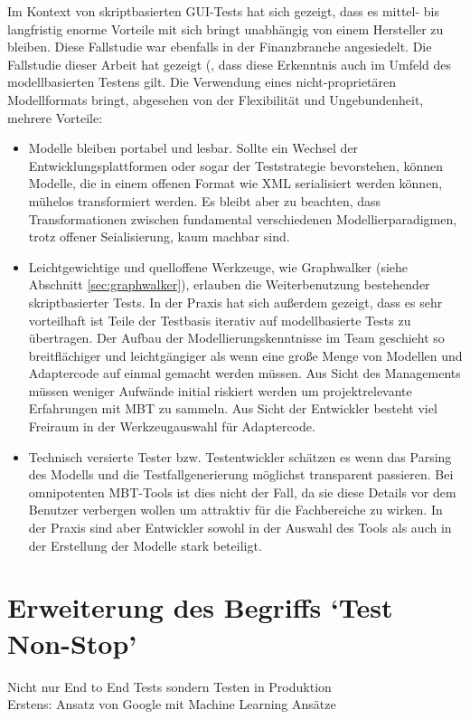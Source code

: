 Im Kontext von skriptbasierten GUI-Tests hat sich gezeigt, dass es mittel- bis langfristig enorme Vorteile mit sich bringt unabhängig von einem Hersteller zu bleiben. Diese Fallstudie war ebenfalls in der Finanzbranche angesiedelt\cite{graham_experiences_2012}. Die Fallstudie dieser Arbeit hat gezeigt (, dass diese Erkenntnis auch im Umfeld des modellbasierten Testens gilt. Die Verwendung eines nicht-proprietären Modellformats bringt, abgesehen von der Flexibilität und Ungebundenheit, mehrere Vorteile:

\begin{itemize}
\item Modelle bleiben portabel und lesbar. Sollte ein Wechsel der Entwicklungsplattformen oder sogar der Teststrategie bevorstehen, können Modelle, die in einem offenen Format wie XML serialisiert werden können, mühelos transformiert werden. Es bleibt aber zu beachten, dass Transformationen zwischen fundamental verschiedenen Modellierparadigmen, trotz offener Seialisierung, kaum machbar sind.
\item Leichtgewichtige und quelloffene Werkzeuge, wie Graphwalker (siehe Abschnitt \ref{sec:graphwalker}), erlauben die Weiterbenutzung bestehender skriptbasierter Tests. In der Praxis hat sich außerdem gezeigt, dass es sehr vorteilhaft ist Teile der Testbasis iterativ auf modellbasierte Tests zu übertragen. Der Aufbau der Modellierungskenntnisse im Team geschieht so breitflächiger und leichtgängiger als wenn eine große Menge von Modellen und Adaptercode auf einmal gemacht werden müssen. Aus Sicht des Managements müssen weniger Aufwände initial riskiert werden um projektrelevante Erfahrungen mit MBT zu sammeln. Aus Sicht der Entwickler besteht viel Freiraum in der Werkzeugauswahl für Adaptercode.
\item Technisch versierte Tester bzw. Testentwickler schätzen es wenn das Parsing des Modells und die Testfallgenerierung möglichst transparent passieren. Bei omnipotenten MBT-Tools ist dies nicht der Fall, da sie diese Details vor dem Benutzer verbergen wollen um attraktiv für die Fachbereiche zu wirken. In der Praxis sind aber Entwickler sowohl in der Auswahl des Tools als auch in der Erstellung der Modelle stark beteiligt.
\end{itemize}


\section{Erweiterung des Begriffs `Test Non-Stop'}
Nicht nur End to End Tests sondern Testen in Produktion\\
Erstens: Ansatz von Google mit Machine Learning Ansätze

